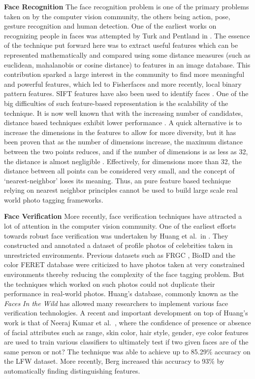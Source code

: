 \textbf{Face Recognition}
The face recognition problem is one of the primary problems taken on by the computer vision community, the others being action, pose, gesture recognition and human detection. One of the earliest works on recognizing people in faces was attempted by Turk and Pentland in \cite{turk1991eigenfaces}. The essence of the technique put forward here was to extract useful features which can be represented mathematically and compared using some distance measures (such as euclidean, mahalanobis or cosine distance) to features in an image database. This contribution sparked a large interest in the community to find more meaningful and powerful features, which led to Fisherfaces \cite{belhumeur1997eigenfaces} and more recently, local binary pattern \cite{ahonen2006face} features. SIFT features have also been used to identify faces \cite{bicego2006use, geng2009sift, luo2007person}. One of the big difficulties of such feature-based representation is the scalability of the technique. It is now well known that with the increasing number of candidates, distance based techniques exhibit lower performance \cite{wu2004probability}. A quick alternative is to increase the dimensions in the features to allow for more diversity, but it has been proven that as the number of dimensions increase, the maximum distance between the two points reduces, and if the number of dimensions is as less as 32, the distance is almost negligible \cite{beyer1999nearest}. Effectively, for dimensions more than 32, the distance between all points can be considered very small, and the concept of `nearest-neighbor' loses its meaning. Thus, an pure feature based technique relying on nearest neighbor principles cannot be used to build large scale real world photo tagging frameworks.

\textbf{Face Verification}
More recently, face verification techniques have attracted a lot of attention in the computer vision community. One of the earliest efforts towards robust face verification was undertaken by Huang et al.\ in \cite{huang2007labeled}. They constructed and annotated a dataset of profile photos of celebrities taken in unrestricted environments. Previous datasets such as FRGC \cite{phillips2005overview}, BioID \cite{jesorsky2001robust} and the color FERET database \cite{phillips1998feret} were criticized to have photos taken at very constrained environments thereby reducing the complexity of the face tagging problem. But the techniques which worked on such photos could not duplicate their performance in real-world photos. Huang's database, commonly known as the \textit{Faces In the Wild} has allowed many researchers to implement various face verification technologies. A recent and important development on top of Huang's work is that of Neeraj Kumar et al.\ \cite{nk_attribute_classifiers}, where the confidence of presence or absence of facial attributes such as range, skin color, hair style, gender, eye color features are used to train various classifiers to ultimately test if two given faces are of the same person or not? The technique was able to achieve up to 85.29\% accuracy on the LFW dataset. More recently, Berg \cite{berg2012tom} increased this accuracy to 93\% by automatically finding distinguishing features.

